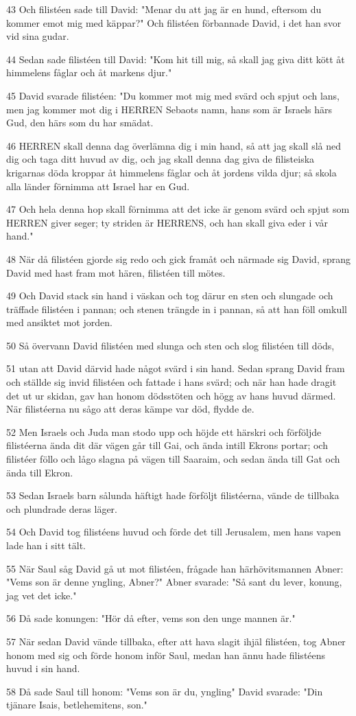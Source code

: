 \par 43 Och filistéen sade till David: "Menar du att jag är en hund, eftersom du kommer emot mig med käppar?" Och filistéen förbannade David, i det han svor vid sina gudar.
\par 44 Sedan sade filistéen till David: "Kom hit till mig, så skall jag giva ditt kött åt himmelens fåglar och åt markens djur."
\par 45 David svarade filistéen: "Du kommer mot mig med svärd och spjut och lans, men jag kommer mot dig i HERREN Sebaots namn, hans som är Israels härs Gud, den härs som du har smädat.
\par 46 HERREN skall denna dag överlämna dig i min hand, så att jag skall slå ned dig och taga ditt huvud av dig, och jag skall denna dag giva de filisteiska krigarnas döda kroppar åt himmelens fåglar och åt jordens vilda djur; så skola alla länder förnimma att Israel har en Gud.
\par 47 Och hela denna hop skall förnimma att det icke är genom svärd och spjut som HERREN giver seger; ty striden är HERRENS, och han skall giva eder i vår hand."
\par 48 När då filistéen gjorde sig redo och gick framåt och närmade sig David, sprang David med hast fram mot hären, filistéen till mötes.
\par 49 Och David stack sin hand i väskan och tog därur en sten och slungade och träffade filistéen i pannan; och stenen trängde in i pannan, så att han föll omkull med ansiktet mot jorden.
\par 50 Så övervann David filistéen med slunga och sten och slog filistéen till döds,
\par 51 utan att David därvid hade något svärd i sin hand. Sedan sprang David fram och ställde sig invid filistéen och fattade i hans svärd; och när han hade dragit det ut ur skidan, gav han honom dödsstöten och högg av hans huvud därmed. När filistéerna nu sågo att deras kämpe var död, flydde de.
\par 52 Men Israels och Juda man stodo upp och höjde ett härskri och förföljde filistéerna ända dit där vägen går till Gai, och ända intill Ekrons portar; och filistéer föllo och lågo slagna på vägen till Saaraim, och sedan ända till Gat och ända till Ekron.
\par 53 Sedan Israels barn sålunda häftigt hade förföljt filistéerna, vände de tillbaka och plundrade deras läger.
\par 54 Och David tog filistéens huvud och förde det till Jerusalem, men hans vapen lade han i sitt tält.
\par 55 När Saul såg David gå ut mot filistéen, frågade han härhövitsmannen Abner: "Vems son är denne yngling, Abner?" Abner svarade: "Så sant du lever, konung, jag vet det icke."
\par 56 Då sade konungen: "Hör då efter, vems son den unge mannen är."
\par 57 När sedan David vände tillbaka, efter att hava slagit ihjäl filistéen, tog Abner honom med sig och förde honom inför Saul, medan han ännu hade filistéens huvud i sin hand.
\par 58 Då sade Saul till honom: "Vems son är du, yngling" David svarade: "Din tjänare Isais, betlehemitens, son."


